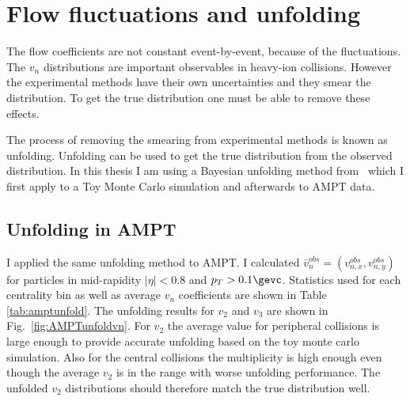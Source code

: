 
\section{Flow fluctuations and unfolding}
The flow coefficients are not constant event-by-event, because of the fluctuations. The $v_n$ distributions are important observables in heavy-ion collisions. However the experimental methods have their own uncertainties and they smear the distribution. To get the true distribution one must be able to remove these effects.

The process of removing the smearing from experimental methods is known as unfolding. Unfolding can be used to get the true distribution from the observed distribution. In this thesis I am using a Bayesian unfolding method from~\cite{dagostini1995} which I first apply to a Toy Monte Carlo simulation and afterwards to AMPT data.

\FloatBarrier
\subsection{Unfolding in AMPT}
I applied the same unfolding method to AMPT. I calculated $\bar v_n^{obs}=\left(v_{n,x}^{obs},v_{n,y}^{obs}\right)$ for particles in mid-rapidity $|\eta|<0.8$ and $p_T>0.1\gevc$. Statistics used for each centrality bin as well as average $v_n$ coefficients are shown in Table \ref{tab:amptunfold}. The unfolding results for $v_2$ and $v_3$ are shown in Fig.~\ref{fig:AMPTunfoldvn}. For $v_2$ the average value for peripheral collisions is large enough to provide accurate unfolding based on the toy monte carlo simulation. Also for the central collisions the multiplicity is high enough even though the average $v_2$ is in the range with worse unfolding performance. The unfolded $v_2$ distributions should therefore match the true distribution well. 

